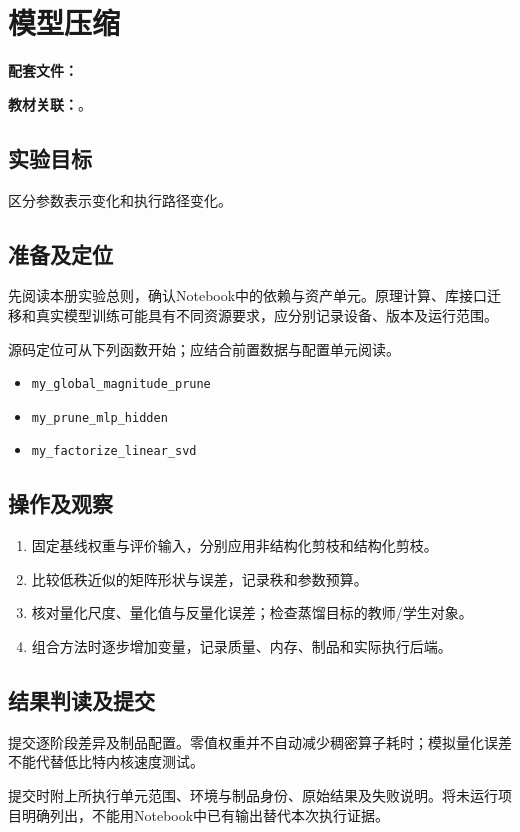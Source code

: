\chapter{模型压缩}
\label{lab:A60_model_compression}

\noindent\textbf{配套文件：}\par
\noindent\textbf{教材关联：}。

\section*{实验目标}
区分参数表示变化和执行路径变化。

\section*{准备及定位}
先阅读本册实验总则，确认Notebook中的依赖与资产单元。原理计算、库接口迁移和真实模型训练可能具有不同资源要求，应分别记录设备、版本及运行范围。

源码定位可从下列函数开始；应结合前置数据与配置单元阅读。
\begin{itemize}
\item \texttt{my\_global\_magnitude\_prune}
\item \texttt{my\_prune\_mlp\_hidden}
\item \texttt{my\_factorize\_linear\_svd}
\end{itemize}

\section*{操作及观察}
\begin{enumerate}
\item 固定基线权重与评价输入，分别应用非结构化剪枝和结构化剪枝。
\item 比较低秩近似的矩阵形状与误差，记录秩和参数预算。
\item 核对量化尺度、量化值与反量化误差；检查蒸馏目标的教师/学生对象。
\item 组合方法时逐步增加变量，记录质量、内存、制品和实际执行后端。
\end{enumerate}

\section*{结果判读及提交}
提交逐阶段差异及制品配置。零值权重并不自动减少稠密算子耗时；模拟量化误差不能代替低比特内核速度测试。

提交时附上所执行单元范围、环境与制品身份、原始结果及失败说明。将未运行项目明确列出，不能用Notebook中已有输出替代本次执行证据。
